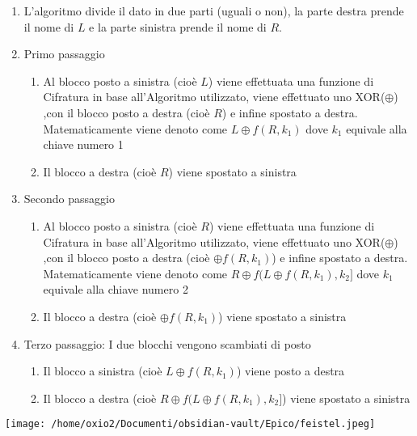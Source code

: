 \documentclass[
]{article}
\providecommand{\tightlist}{%
  \setlength{\itemsep}{0pt}\setlength{\parskip}{0pt}}
\begin{document}
\begin{enumerate}
\tightlist
\item
  L'algoritmo divide il dato in due parti (uguali o non), la parte
  destra prende il nome di {\(L\)} e la parte sinistra prende il nome di
  {\(R\)}.
\item
  Primo passaggio

  \begin{enumerate}
  \tightlist
  \item
    Al blocco posto a sinistra (cioè {\(L\)}) viene effettuata una
    funzione di Cifratura in base all'Algoritmo utilizzato, viene
    effettuato uno XOR({\(\oplus\)}) ,con il blocco posto a destra (cioè
    {\(R\)}) e infine spostato a destra. Matematicamente viene denoto
    come {\(L \oplus f(R,k_{1})\)} dove {\(k_{1}\)} equivale alla chiave
    numero 1
  \item
    Il blocco a destra (cioè {\(R\)}) viene spostato a sinistra
  \end{enumerate}
\item
  Secondo passaggio

  \begin{enumerate}
  \tightlist
  \item
    Al blocco posto a sinistra (cioè {\(R\)}) viene effettuata una
    funzione di Cifratura in base all'Algoritmo utilizzato, viene
    effettuato uno XOR({\(\oplus\)}) ,con il blocco posto a destra (cioè
    {\(\oplus f(R,k_{1})\)}) e infine spostato a destra. Matematicamente
    viene denoto come {\(R \oplus f(L \oplus f(R,k_{1}),k_{2}\rbrack\)}
    dove {\(k_{1}\)} equivale alla chiave numero 2
  \item
    Il blocco a destra (cioè {\(\oplus f(R,k_{1})\)}) viene spostato a
    sinistra
  \end{enumerate}
\item
  Terzo passaggio: I due blocchi vengono scambiati di posto

  \begin{enumerate}
  \tightlist
  \item
    Il blocco a sinistra (cioè {\(L \oplus f(R,k_{1})\)}) viene posto a
    destra
  \item
    Il blocco a destra (cioè
    {\(R \oplus f(L \oplus f(R,k_{1}),k_{2}\rbrack\)}) viene spostato a
    sinistra
  \end{enumerate}
\end{enumerate}

\texttt{[image: /home/oxio2/Documenti/obsidian-vault/Epico/feistel.jpeg]}
\end{document}
